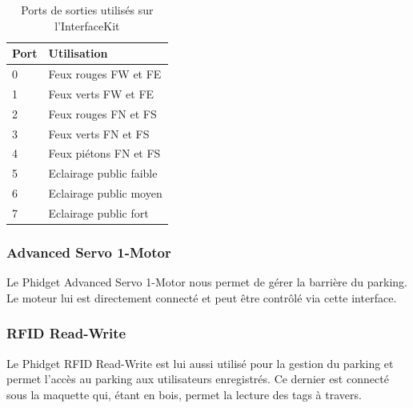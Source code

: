 \begin{table}[H]
\centering
\captionsetup{width=\textwidth}
{\renewcommand{\arraystretch}{1.5}
    \begin{tabular}{| l | l |}
    \hline
    \textbf{Port} & \textbf{Utilisation}\\
    \hline
    0 & Feux rouges FW et FE\\
    \hline
    1 & Feux verts FW et FE\\
    \hline
    2 & Feux rouges FN et FS\\
    \hline
    3 & Feux verts FN et FS\\
    \hline
    4 & Feux piétons FN et FS\\
    \hline
    5 & Eclairage public faible\\
    \hline
    6 & Eclairage public moyen\\
    \hline
    7 & Eclairage public fort\\
    \hline
    \end{tabular}}
    \caption{Ports de sorties utilisés sur l'InterfaceKit}
\end{table}

\subsubsection{Advanced Servo 1-Motor}
Le Phidget Advanced Servo 1-Motor nous permet de gérer la barrière du parking. Le moteur lui est directement connecté et peut être contrôlé via cette interface.

\subsubsection{RFID Read-Write}
Le Phidget RFID Read-Write est lui aussi utilisé pour la gestion du parking et permet l’accès au parking aux utilisateurs enregistrés. Ce dernier est connecté sous la maquette qui, étant en bois, permet la lecture des tags à travers.